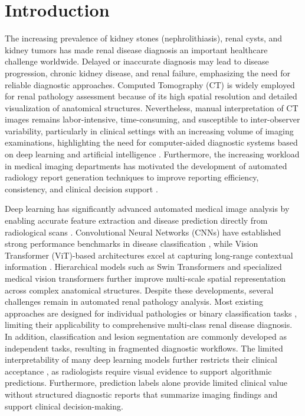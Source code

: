 \documentclass[]{elsarticle}
\begin{document}
\section{Introduction}\label{sec:intro}

The increasing prevalence of kidney stones (nephrolithiasis), renal cysts, and kidney tumors has made renal disease diagnosis an important healthcare challenge worldwide. Delayed or inaccurate diagnosis may lead to disease progression, chronic kidney disease, and renal failure, emphasizing the need for reliable diagnostic approaches. Computed Tomography (CT) is widely employed for renal pathology assessment because of its high spatial resolution and detailed visualization of anatomical structures. Nevertheless, manual interpretation of CT images remains labor-intensive, time-consuming, and susceptible to inter-observer variability, particularly in clinical settings with an increasing volume of imaging examinations, highlighting the need for computer-aided diagnostic systems based on deep learning and artificial intelligence \cite{litjens2017survey}. Furthermore, the increasing workload in medical imaging departments has motivated the development of automated radiology report generation techniques to improve reporting efficiency, consistency, and clinical decision support \cite{sloan2024automated}.

Deep learning has significantly advanced automated medical image analysis by enabling accurate feature extraction and disease prediction directly from radiological scans \cite{lecun2015deep}. Convolutional Neural Networks (CNNs) have established strong performance benchmarks in disease classification \cite{kermany2018identifying}, while Vision Transformer (ViT)-based architectures excel at capturing long-range contextual information \cite{dosovitskiy2020image}. Hierarchical models such as Swin Transformers \cite{liu2021swin} and specialized medical vision transformers \cite{aburass2025vision} further improve multi-scale spatial representation across complex anatomical structures. Despite these developments, several challenges remain in automated renal pathology analysis. Most existing approaches are designed for individual pathologies \cite{hossain2025detection} or binary classification tasks \cite{kermany2018identifying}, limiting their applicability to comprehensive multi-class renal disease diagnosis. In addition, classification and lesion segmentation are commonly developed as independent tasks, resulting in fragmented diagnostic workflows. The limited interpretability of many deep learning models further restricts their clinical acceptance \cite{holzinger2019causability}, as radiologists require visual evidence \cite{selvaraju2017grad} to support algorithmic predictions. Furthermore, prediction labels alone provide limited clinical value without structured diagnostic reports that summarize imaging findings and support clinical decision-making.
\end{document}
